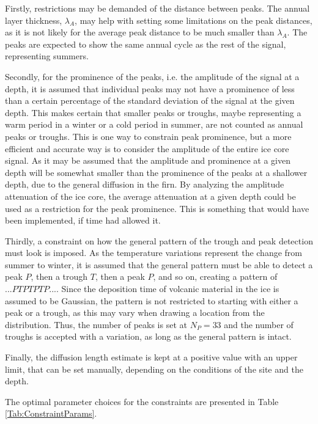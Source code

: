 \documentclass[../../CompleteThesis2/Complete_2ndDraft]{subfiles}
\begin{document}
Firstly, restrictions may be demanded of the distance between peaks. The annual layer thickness, $\lambda_A$, may help with setting some limitations on the peak distances, as it is not likely for the average peak distance to be much smaller than $\lambda_A$. The peaks are expected to show the same annual cycle as the rest of the signal, representing summers. 

Secondly, for the prominence of the peaks, i.e. the amplitude of the signal at a depth, it is assumed that individual peaks may not have a prominence of less than a certain percentage of the standard deviation of the signal at the given depth. This makes certain that smaller peaks or troughs, maybe representing a warm period in a winter or a cold period in summer, are not counted as annual peaks or troughs. 
This is one way to constrain peak prominence, but a more efficient and accurate way is to consider the amplitude of the entire ice core signal. As it may be assumed that the amplitude and prominence at a given depth will be somewhat smaller than the prominence of the peaks at a shallower depth, due to the general diffusion in the firn. By analyzing the amplitude attenuation of the ice core, the average attenuation at a given depth could be used as a restriction for the peak prominence. This is something that would have been implemented, if time had allowed it.


Thirdly, a constraint on how the general pattern of the trough and peak detection must look is imposed. As the temperature variations represent the change from summer to winter, it is assumed that the general pattern must be able to detect a peak $P$, then a trough $T$, then a peak $P$, and so on, creating a pattern of $...PTPTPTP...$. Since the deposition time of volcanic material in the ice is assumed to be Gaussian, the pattern is not restricted to starting with either a peak or a trough, as this may vary when drawing a location from the distribution. Thus, the number of peaks is set at $N_P=33$ and the number of troughs is accepted with a variation, as long as the general pattern is intact.

Finally, the diffusion length estimate is kept at a positive value with an upper limit, that can be set manually, depending on the conditions of the site and the depth. 

The optimal parameter choices for the constraints are presented in Table \ref{Tab:ConstraintParams}.
\end{document}
